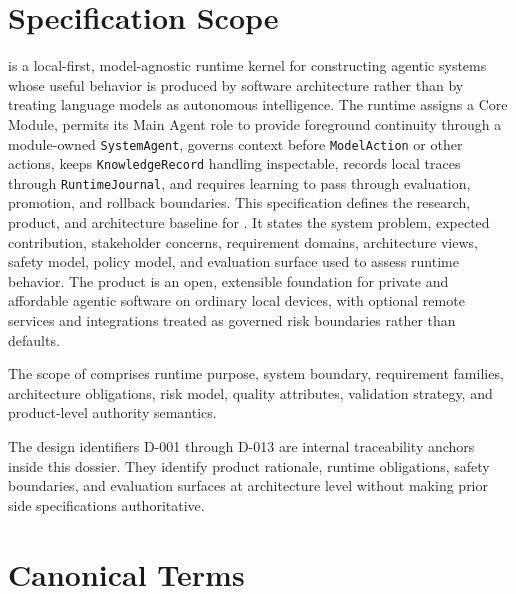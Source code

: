 \section*{Specification Scope}

\Madre is a local-first, model-agnostic runtime kernel for constructing agentic systems whose useful behavior is produced by software architecture rather than by treating language models as autonomous intelligence. The runtime assigns a Core Module, permits its Main Agent role to provide foreground continuity through a module-owned \texttt{SystemAgent}, governs context before \texttt{ModelAction} or other actions, keeps \texttt{KnowledgeRecord} handling inspectable, records local traces through \texttt{RuntimeJournal}, and requires learning to pass through evaluation, promotion, and rollback boundaries.
\n
This specification defines the research, product, and architecture baseline for \madre. It states the system problem, expected contribution, stakeholder concerns, requirement domains, architecture views, safety model, policy model, and evaluation surface used to assess runtime behavior. The product is an open, extensible foundation for private and affordable agentic software on ordinary local devices, with optional remote services and integrations treated as governed risk boundaries rather than defaults.\n

The scope of \Madre comprises runtime purpose, system boundary, requirement families, architecture obligations, risk model, quality attributes, validation strategy, and product-level authority semantics.\n

The design identifiers D-001 through D-013 are internal traceability anchors inside this dossier. They identify product rationale, runtime obligations, safety boundaries, and evaluation surfaces at architecture level without making prior side specifications authoritative.

\section*{Canonical Terms}

